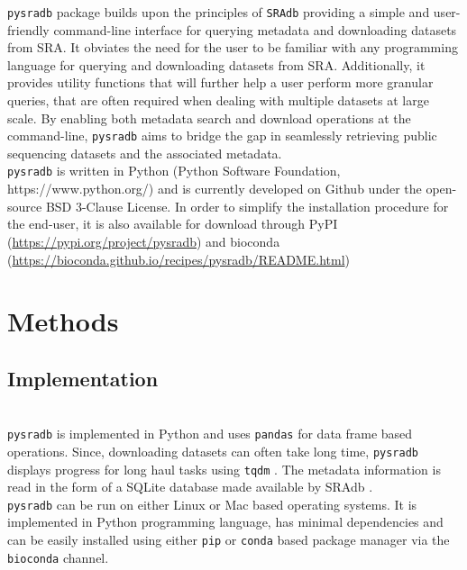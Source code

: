 \documentclass[9pt,a4paper]{extarticle}
\begin{document}
\texttt{pysradb} package builds upon the principles of \texttt{SRAdb} 
providing a simple and user-friendly command-line interface for querying metadata and downloading
datasets from SRA. It obviates the need for the
user to be familiar with any programming language for querying and
downloading datasets from SRA. Additionally, it provides utility 
functions that will further help a user perform more granular queries, that
are often required when dealing with multiple datasets at large scale. By enabling both metadata
search and download operations at the command-line, \texttt{pysradb} aims to bridge the gap in
seamlessly retrieving public sequencing datasets and the associated metadata.
~\\

\texttt{pysradb} is written in Python (Python Software Foundation, 
https://www.python.org/) \cite{vanRossum:2011:PLR:2011965} and is currently developed
on Github under the open-source BSD 3-Clause License. In order to simplify the installation
procedure for the end-user, it is also available for download through PyPI (\url{https://pypi.org/project/pysradb})
and bioconda \cite{gruning2018bioconda} (\url{https://bioconda.github.io/recipes/pysradb/README.html})
~\\
\section*{Methods}
\subsection*{Implementation}
~\\
\texttt{pysradb} is implemented in Python and uses
\texttt{pandas} \cite{mckinney-proc-scipy-2010} for data frame based operations. 
Since, downloading datasets can often take long time, \texttt{pysradb} displays 
progress for long haul tasks using \texttt{tqdm}
\cite{casper_da_costa_luis_2018_1211527}. The metadata information is read in the
form of a SQLite \cite{about_sqlite} database made available by SRAdb
\cite{zhu2013sradb}. 
~\\

\texttt{pysradb} can be run on either Linux or Mac based operating systems. It
is implemented in Python programming language, has minimal dependencies and can
be easily installed using either \texttt{pip} or \texttt{conda} based package
manager via the \texttt{bioconda} \cite{gruning2018bioconda} channel. 
~\\
\end{document}
